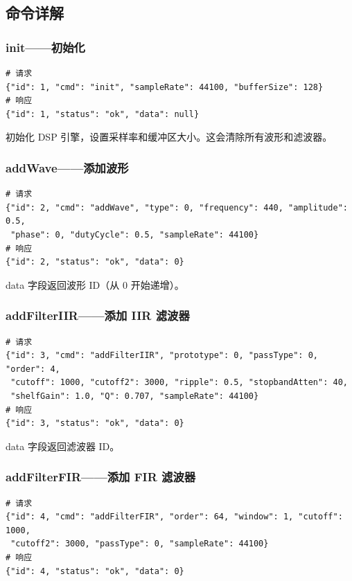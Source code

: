 ﻿\documentclass[12pt,a4paper,oneside]{ctexbook}
\begin{document}
\subsection{命令详解}

\subsubsection{init——初始化}

\begin{lstlisting}[caption={init 命令格式}]
# 请求
{"id": 1, "cmd": "init", "sampleRate": 44100, "bufferSize": 128}
# 响应
{"id": 1, "status": "ok", "data": null}
\end{lstlisting}

初始化 DSP 引擎，设置采样率和缓冲区大小。这会清除所有波形和滤波器。

\subsubsection{addWave——添加波形}

\begin{lstlisting}[caption={addWave 命令格式}]
# 请求
{"id": 2, "cmd": "addWave", "type": 0, "frequency": 440, "amplitude": 0.5, 
 "phase": 0, "dutyCycle": 0.5, "sampleRate": 44100}
# 响应
{"id": 2, "status": "ok", "data": 0}
\end{lstlisting}

data 字段返回波形 ID（从 0 开始递增）。

\subsubsection{addFilterIIR——添加 IIR 滤波器}

\begin{lstlisting}[caption={addFilterIIR 命令格式}]
# 请求
{"id": 3, "cmd": "addFilterIIR", "prototype": 0, "passType": 0, "order": 4,
 "cutoff": 1000, "cutoff2": 3000, "ripple": 0.5, "stopbandAtten": 40,
 "shelfGain": 1.0, "Q": 0.707, "sampleRate": 44100}
# 响应
{"id": 3, "status": "ok", "data": 0}
\end{lstlisting}

data 字段返回滤波器 ID。

\subsubsection{addFilterFIR——添加 FIR 滤波器}

\begin{lstlisting}[caption={addFilterFIR 命令格式}]
# 请求
{"id": 4, "cmd": "addFilterFIR", "order": 64, "window": 1, "cutoff": 1000,
 "cutoff2": 3000, "passType": 0, "sampleRate": 44100}
# 响应
{"id": 4, "status": "ok", "data": 0}
\end{lstlisting}
\end{document}
